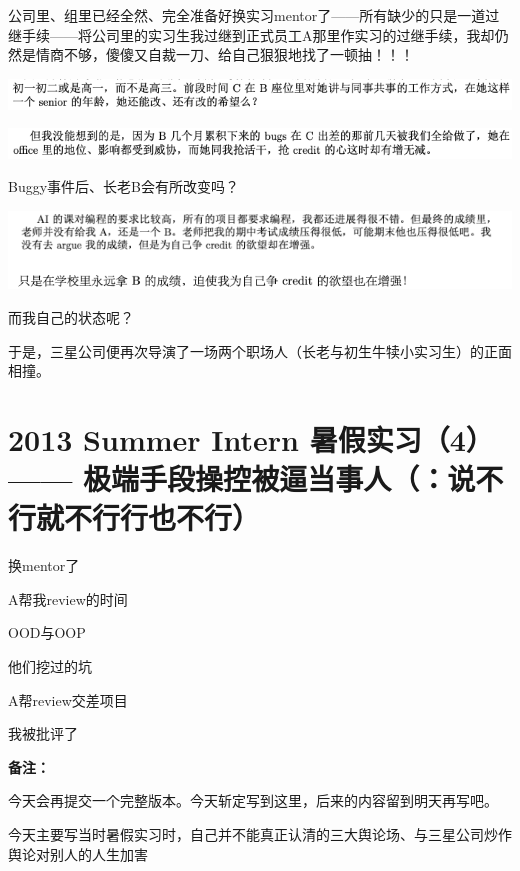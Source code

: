 \documentclass[9pt, b5paper]{article}
\begin{document}
公司里、组里已经全然、完全准备好换实习mentor了——所有缺少的只是一道过继手续——将公司里的实习生我过继到正式员工A那里作实习的过继手续，我却仍然是情商不够，傻傻又自裁一刀、给自己狠狠地找了一顿抽！！！

\begin{center}
\includegraphics[width=.9\linewidth]{./pic/backups_plans_20210508_120101.png}
\end{center}

\begin{center}
\includegraphics[width=.9\linewidth]{./pic/backups_plans_20210508_115956.png}
\end{center}

Buggy事件后、长老B会有所改变吗？

\begin{center}
\includegraphics[width=.9\linewidth]{./pic/backups_plans_20210508_120536.png}
\end{center}

而我自己的状态呢？

于是，三星公司便再次导演了一场两个职场人（长老与初生牛犊小实习生）的正面相撞。

\section{2013 Summer Intern 暑假实习（4） —— 极端手段操控被逼当事人（：说不行就不行行也不行）}
\label{sec:org9bebb4e}

换mentor了

A帮我review的时间

OOD与OOP 

他们挖过的坑

A帮review交差项目

我被批评了

\textbf{备注：}

今天会再提交一个完整版本。今天斩定写到这里，后来的内容留到明天再写吧。

今天主要写当时暑假实习时，自己并不能真正认清的三大舆论场、与三星公司炒作舆论对别人的人生加害
\end{document}
